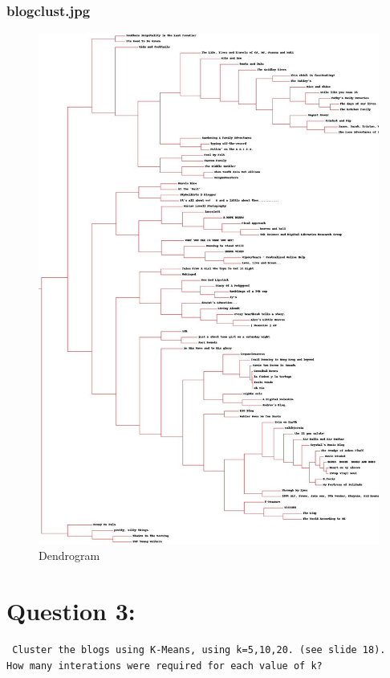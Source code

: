 \documentclass[12pt]{article}
\begin{document}
\subsubsection{blogclust.jpg}
\begin{figure}[ht]
\includegraphics[scale=0.2]{../Q2/blogclust}
\centering
\caption{Dendrogram}
\label{fig:blogclust}
\end{figure}
\newpage


\section{Question 3:}
\begin{verbatim}
 Cluster the blogs using K-Means, using k=5,10,20. (see slide 18).
How many interations were required for each value of k?
\end{verbatim}
\end{document}
